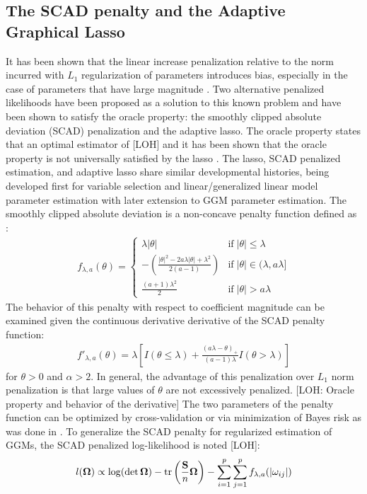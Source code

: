 \subsection{The SCAD penalty and the Adaptive Graphical Lasso}
It has been shown that the linear increase penalization relative to the norm incurred with $L_1$ regularization of parameters introduces bias, especially in the case of parameters that have large magnitude \cite{fan2009,lam2009}. Two alternative penalized likelihoods have been proposed as a solution to this known problem and have been shown to satisfy the oracle property: the smoothly clipped absolute deviation (SCAD) penalization and the adaptive lasso. The oracle property states that an optimal estimator of [LOH] and it has been shown that the oracle property is not universally satisfied by the lasso \cite{zou2006}. The lasso, SCAD penalized estimation, and adaptive lasso share similar developmental histories, being developed first for variable selection and linear/generalized linear model parameter estimation with later extension to GGM parameter estimation. The smoothly clipped absolute deviation is a non-concave penalty function defined as \cite{fan2001}:
\begin{align}
f_{\lambda,a}(\theta)=
\begin{cases} 
\lambda |\theta| & \text{if} \; |\theta|\leq \lambda \\
-\left(\frac{|\theta|^2 -2a \lambda |\theta|+\lambda^2}{2(a-1)}\right)& \text{if}\; |\theta| \in (\lambda,a \lambda] \\
\frac{(a+1)\lambda^2}{2} & \text{if} \; |\theta|>a \lambda 
\end{cases}
\end{align}
The behavior of this penalty with respect to coefficient magnitude can be examined given the continuous derivative derivative of the SCAD penalty function:
\begin{align}
f'_{\lambda,a}(\theta)=\lambda \left[I(\theta \leq \lambda) + \frac{(a \lambda-\theta)_+}{(a-1)\lambda}I(\theta>\lambda)\right]
\end{align}
for $\theta > 0$ and $\alpha>2$. In general, the advantage of this penalization over $L_1$ norm penalization is that large values of $\theta$ are not excessively penalized. [LOH: Oracle property and behavior of the derivative] The two parameters of the penalty function can be optimized by cross-validation or via minimization of Bayes risk as was done in \cite{fan2001}. To generalize the SCAD penalty for regularized estimation of GGMs, the SCAD penalized log-likelihood is noted [LOH]:
\begin{align*}
l(\boldsymbol{\Omega}) \propto \log(\det \boldsymbol{\Omega})-\operatorname{tr} \left(\frac{\textbf{S}}{n} \boldsymbol{\Omega} \right) - \sum_{i=1}^{p} \sum_{j=1}^{p} f_{\lambda,a} (|\omega_{ij}|)
\end{align*}

